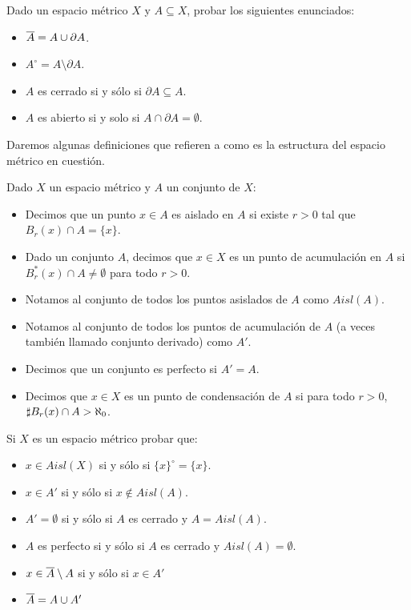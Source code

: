 \documentclass[12pt,a4paper]{book}
\begin{document}
\begin{ej} Dado un espacio métrico $X$ y $A \subseteq X$, probar los siguientes enunciados:
\begin{itemize}
\item $\overline{A} = A \cup \partial A$.
\item $A^\circ = A \setminus \partial A$.
\item $A$ es cerrado si y sólo si $\partial A \subseteq A$.
\item $A$ es abierto si y solo si $A \cap \partial A = \emptyset$.
\end{itemize}
\end{ej}
Daremos algunas definiciones que refieren a como es la estructura del espacio métrico en cuestión.
\begin{defi} Dado $X$ un espacio métrico y $A$ un conjunto de $X$:
\begin{itemize}
\item Decimos que un punto $x \in A$ es aislado en $A$ si existe $r>0$ tal que $B_r(x) \cap A = \{x\}$.
\item Dado un conjunto $A$, decimos que $x \in X$ es un punto de acumulación en $A$ si $B^*_r(x) \cap A \neq \emptyset$ para todo $r>0$.
\item Notamos al conjunto de todos los puntos asislados de $A$ como $Aisl(A)$.
\item Notamos al conjunto de todos los puntos de acumulación de $A$ (a veces también llamado conjunto derivado) como $A'$.
\item Decimos que un conjunto es perfecto si $A' = A$.
\item Decimos que $x \in X$ es un punto de condensación de $A$ si para todo $r>0$, $\sharp B_r(x) \cap A > \a0$. 
\end{itemize}
\end{defi}
\begin{ej} Si $X$ es un espacio métrico probar que:
\begin{itemize}
\item $x \in Aisl(X)$ si y sólo si $\{x\}^\circ = \{x\}$.
\item $x \in A'$ si y sólo si $x \notin Aisl(A)$.
\item $A' = \emptyset$ si y sólo si $A$ es cerrado y $A = Aisl(A)$.
\item $A$ es perfecto si y sólo si $A$ es cerrado y $Aisl(A)=\emptyset$.
\item $x \in \overline{A} \setminus A$ si y sólo si $x \in A'$
\item $\overline{A} = A \cup A'$
\end{itemize}
\end{ej}
\end{document}
